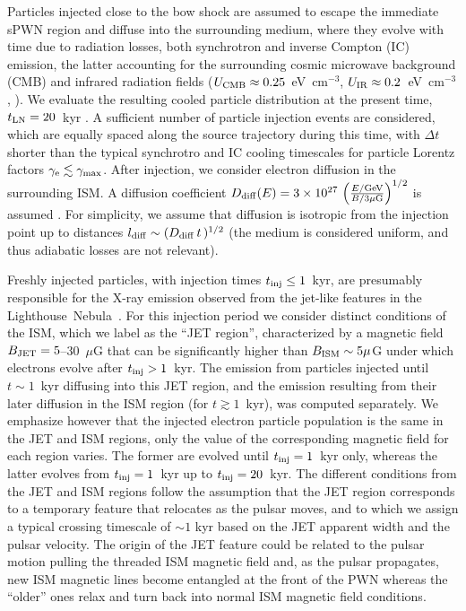 \documentclass[letter]{aa}
\newcommand{\lneb}{Lighthouse~Nebula~}
\begin{document}



Particles injected close to the bow shock are assumed to escape the immediate sPWN region and diffuse into the surrounding medium, where they evolve with time due to radiation losses, both synchrotron and inverse Compton (IC) emission, the latter accounting for the surrounding cosmic microwave background (CMB) and infrared radiation fields ($U_{\rm CMB} \approx 0.25$~eV~cm$^{-3}$, $U_{\rm IR} \approx 0.2$~eV~cm$^{-3}$, \citealp{Popescu2017}). We evaluate the resulting cooled particle distribution at the present time, $t_{\rm LN} = 20$~kyr \citep{Halpern2014}. A sufficient number of particle injection events are considered, which are equally spaced along the source trajectory during this time, with $\Delta t$ shorter than the typical synchrotro and IC cooling timescales for particle Lorentz factors $\gamma_{\rm e}\lesssim \gamma_{\rm max}$. 
%
After injection, we consider electron diffusion in the surrounding ISM. A diffusion coefficient $D_{\rm diff}(E) = 3 \times 10^{27} \, \left(  \frac{E/\rm{GeV}} {B/\rm{ 3}\mu \rm{G}} \right)^{1/2}$ is assumed \citep{Gabici2007}. For simplicity, we assume that diffusion is isotropic from the injection point up to distances $l_{\rm diff} \sim (D_{\rm diff}\,t\,)^{1/2}$ (the medium is considered uniform, and thus adiabatic losses are not relevant). 

Freshly injected particles, with injection times $t_{\rm inj} \leq 1$~kyr, are presumably responsible for the X-ray emission observed from the jet-like features in the \lneb. For this injection period we consider distinct conditions of the ISM, which we label as the ``JET region'', characterized by a magnetic field $B_{\rm JET} = 5$--30~$\mu$G that can be significantly higher than $B_{\rm ISM} \sim 5 \mu$G under which electrons evolve after $t_{\rm inj} > 1$~kyr. The emission from particles injected until $t \sim 1$~kyr diffusing into this JET region, and the emission resulting from their later diffusion in the ISM region (for $t \gtrsim 1$~kyr), was computed separately. We emphasize however that the injected electron particle population is the same in the JET and ISM regions, only the value of the corresponding magnetic field for each region varies. The former are evolved until $t_{\rm inj} = 1$~kyr only, whereas the latter evolves from $t_{\rm inj} = 1$~kyr up to $t_{\rm inj} = 20$~kyr. 
%
The different conditions from the JET and ISM regions follow the assumption that the JET region corresponds to a temporary feature that relocates as the pulsar moves, and to which we assign a typical crossing timescale of $\sim 1$ kyr based on the JET apparent width and the pulsar velocity. The origin of the JET feature could be related to the pulsar motion pulling the threaded ISM magnetic field and, as the pulsar propagates, new ISM magnetic lines become entangled at the front of the PWN whereas the ``older'' ones relax and turn back into normal ISM magnetic field conditions.
%
\end{document}
